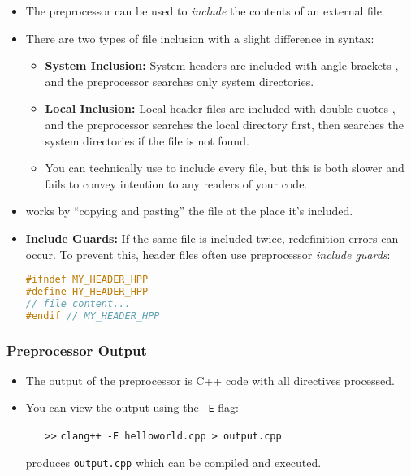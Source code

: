 \documentclass{article}
\begin{document}
\begin{itemize}
	\item The preprocessor can be used to \textit{include} the contents of an external file.
	\item There are two types of file inclusion with a slight difference in syntax:
	\begin{itemize}
		\item \textbf{System Inclusion:} System headers are included with angle brackets \inlinecpp{<>}, and the preprocessor searches only system directories.
		\item \textbf{Local Inclusion:} Local header files are included with double quotes , and the preprocessor searches the local directory first, then searches the system directories if the file is not found.
		\item You can technically use  to include every file, but this is both slower and fails to convey intention to any readers of your code.
	\end{itemize}
	\item {} works by ``copying and pasting'' the file at the place it's included.
	\item \textbf{Include Guards:} If the same file is included twice, redefinition errors can occur. To prevent this, header files often use preprocessor \textit{include guards}:
\begin{lstlisting}[language=c++]
#ifndef MY_HEADER_HPP
#define HY_HEADER_HPP
// file content...
#endif // MY_HEADER_HPP
\end{lstlisting}
\end{itemize}

\subsubsection{Preprocessor Output}

\begin{itemize}
	\item The output of the preprocessor is C++ code with all directives processed.
	\item You can view the output using the \texttt{-E} flag:
	\begin{itemize}
		\item[\texttt{>>}] \texttt{clang++ -E helloworld.cpp > output.cpp}
	\end{itemize}
	produces \texttt{output.cpp} which can be compiled and executed.
\end{itemize}
\end{document}
